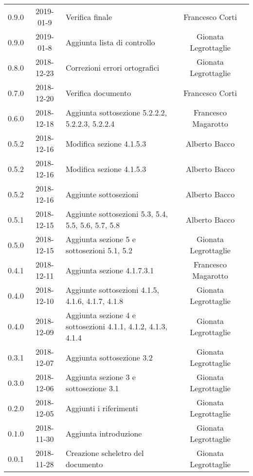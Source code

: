 {\begin{longtable}{ c c C{4cm}  c  c }
		0.9.0 & 2019-01-9 & Verifica finale & Francesco Corti & \ver{} \\
		
		0.9.0 & 2019-01-8 & Aggiunta lista di controllo & Gionata Legrottaglie & \reda{} \\
		
		0.8.0 & 2018-12-23 & Correzioni errori ortografici & Gionata Legrottaglie & \reda{} \\
		
		0.7.0 & 2018-12-20 & Verifica documento & Francesco Corti & \ver{}\\
		
		0.6.0 & 2018-12-18 & Aggiunta sottosezione 5.2.2.2, 5.2.2.3, 5.2.2.4 & Francesco Magarotto & \reda{} \\
		
		0.5.2 & 2018-12-16 & Modifica sezione 4.1.5.3 & Alberto Bacco & \reda{} \\
		
		0.5.2 & 2018-12-16 & Modifica sezione 4.1.5.3 & Alberto Bacco & \reda{} \\
		
		0.5.2 & 2018-12-16 & Aggiunte sottosezioni  & Alberto Bacco & \reda{} \\
		
		0.5.1 & 2018-12-15 & Aggiunte sottosezioni 5.3, 5.4, 5.5, 5.6, 5.7, 5.8 & Alberto Bacco & \reda{} \\
		
		0.5.0 & 2018-12-15 & Aggiunta sezione 5 e sottosezioni 5.1, 5.2 & Gionata Legrottaglie & \reda{} \\
		
		0.4.1 & 2018-12-11 & Aggiunta sezione 4.1.7.3.1 & Francesco Magarotto & \reda{} \\ 
		
		0.4.0 & 2018-12-10 & Aggiunte sottosezioni 4.1.5, 4.1.6, 4.1.7, 4.1.8 & Gionata Legrottaglie & \reda{} \\ 
		0.4.0 & 2018-12-09 & Aggiunta sezione 4 e sottosezioni 4.1.1, 4.1.2, 4.1.3, 4.1.4 & Gionata Legrottaglie & \reda{} \\ 
		
		0.3.1 & 2018-12-07 & Aggiunta sottosezione 3.2 & Gionata Legrottaglie & \reda{} \\ 
		
		0.3.0 & 2018-12-06 & Aggiunta sezione 3 e sottosezione 3.1 & Gionata Legrottaglie & \reda{} \\ 
		
		0.2.0 & 2018-12-05 & Aggiunti i riferimenti & Gionata Legrottaglie & \reda{} \\ 
		
		0.1.0 & 2018-11-30 & Aggiunta introduzione & Gionata Legrottaglie & \reda{} \\
		
		0.0.1 & 2018-11-28 & Creazione scheletro del documento & Gionata Legrottaglie & \reda{}\\
		
	\end{longtable}

}